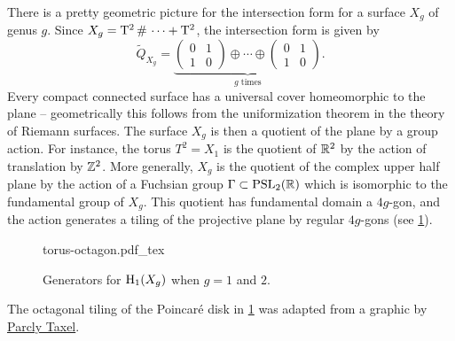 \begin{example}
	There is a pretty geometric picture for the intersection form for a surface $X_g$ of genus $g$. Since $X_g=\T^2\+\cdots+\T^2$, the intersection form is given by
	\[
		\widetilde{Q}_{X_g} = \underbrace{\begin{pmatrix}0&1\\1&0\end{pmatrix}\oplus\cdots\oplus \begin{pmatrix}0&1\\1&0\end{pmatrix}}_{g\textrm{ times}}.
	\]
	Every compact connected surface has a universal cover homeomorphic to the plane -- geometrically this follows from the uniformization theorem in the theory of Riemann surfaces. The surface $X_g$ is then a quotient of the plane by a group action. For instance, the torus $T^2=X_1$ is the quotient of $\mathbb{R}^2$ by the action of translation by $\mathbb{Z}^2$. More generally, $X_g$ is the quotient of the complex upper half plane by the action of a Fuchsian group $\Gamma\subset \mathrm{PSL}_2(\mathbb{R})$ which is isomorphic to the fundamental group of $X_g$. This quotient has fundamental domain a $4g$-gon, and the action generates a tiling of the projective plane by regular $4g$-gons (see \cref{fig:torus-octagon}).

	\begin{figure}[ht]
		\centering
		{torus-octagon.pdf_tex}
		\caption{Generators for $\operatorname{H}_1(X_g)$ when $g=1$ and $2$.}\label{fig:torus-octagon}
	\end{figure}

	\begin{remark}
		The octagonal tiling of the Poincar\'e disk in \cref{fig:torus-octagon} was adapted from a graphic by \href{https://commons.wikimedia.org/wiki/User:Parcly_Taxel}{Parcly Taxel}.
	\end{remark}


\end{example}
